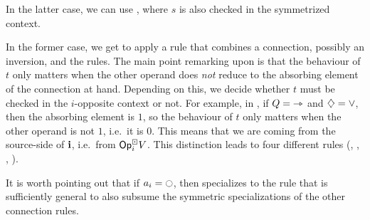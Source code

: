 \documentclass[a4paper]{memoir}
\begin{document}
In the latter case, we can use , where $s$ is also checked in the symmetrized context.

In the former case, we get to apply a rule that combines a connection, possibly an inversion, and the  rules.
The main point remarking upon is that the behaviour of $t$ only matters when the other operand does \emph{not} reduce to the absorbing element of the connection at hand.
Depending on this, we decide whether $t$ must be checked in the $i$-opposite context or not.
For example, in , if $Q = {\rightarrowtriangle}$ and $\mathbin{\diamondsuit} = \vee$, then the absorbing element is $1$, so the behaviour of $t$ only matters when the other operand is not $1$, i.e.\ it is $0$.
This means that we are coming from the source-side of $\mathbf{i}$, i.e.\ from ${\mathsf{Op}}^\boxdot_i V$.
This distinction leads to four different rules (, , , ).

It is worth pointing out that if $a_i = \npolar$, then  specializes to the rule  that is sufficiently general to also subsume the symmetric specializations of the other connection rules.
\end{document}
